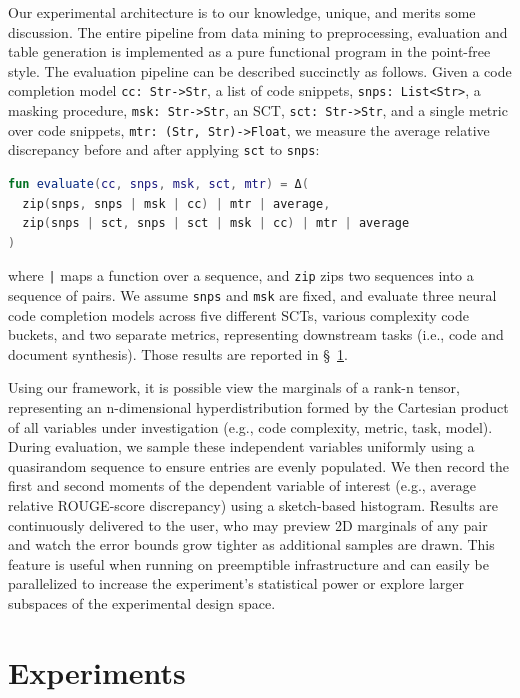 \documentclass{article} %
\begin{document}
Our experimental architecture is to our knowledge, unique, and merits some discussion. The entire pipeline from data mining to preprocessing, evaluation and table generation is implemented as a pure functional program in the point-free style. The evaluation pipeline can be described succinctly as follows. Given a code completion model \lstinline|cc: Str->Str|, a list of code snippets, \lstinline|snps: List<Str>|, a masking procedure, \lstinline|msk: Str->Str|, an SCT, \lstinline|sct: Str->Str|, and a single metric over code snippets, \lstinline|mtr: (Str, Str)->Float|, we measure the average relative discrepancy before and after applying \lstinline|sct| to \lstinline|snps|:

\noindent\begin{lstlisting}[basicstyle=\footnotesize\ttfamily, language=kotlin,label={lst:lstlisting}]
fun evaluate(cc, snps, msk, sct, mtr) = Δ(
  zip(snps, snps | msk | cc) | mtr | average,
  zip(snps | sct, snps | sct | msk | cc) | mtr | average
)
\end{lstlisting}

\noindent where \texttt{|} maps a function over a sequence, and \lstinline|zip| zips two sequences into a sequence of pairs. We assume \lstinline|snps| and \lstinline|msk| are fixed, and evaluate three neural code completion models across five different SCTs, various complexity code buckets, and two separate metrics, representing downstream tasks (i.e., code and document synthesis). Those results are reported in \S~\ref{sec:results}.

Using our framework, it is possible view the marginals of a rank-n tensor, representing an n-dimensional hyperdistribution formed by the Cartesian product of all variables under investigation (e.g., code complexity, metric, task, model). During evaluation, we sample these independent variables uniformly using a quasirandom sequence to ensure entries are evenly populated. We then record the first and second moments of the dependent variable of interest (e.g., average relative ROUGE-score discrepancy) using a sketch-based histogram. Results are continuously delivered to the user, who may preview 2D marginals of any pair and watch the error bounds grow tighter as additional samples are drawn. This feature is useful when running on preemptible infrastructure and can easily be parallelized to increase the experiment's statistical power or explore larger subspaces of the experimental design space.

\section{Experiments}\label{sec:results}
\end{document}
